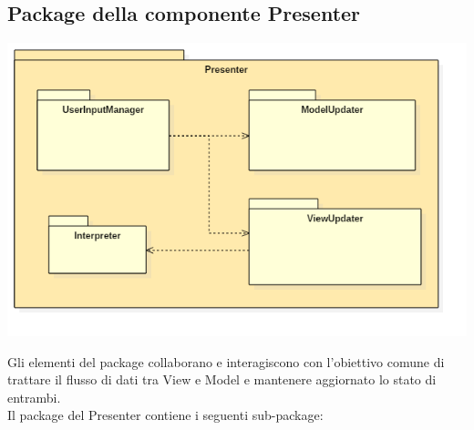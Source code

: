 \documentclass[a4paper,11pt]{article}
\begin{document}
	\subsection{Package della componente Presenter}
	\begin{center}
		\includegraphics[scale=0.6]{../images/PresenterPackage.png}
	\end{center}
	Gli elementi del package collaborano e interagiscono con l'obiettivo comune di trattare il flusso di dati tra View e Model e mantenere aggiornato lo stato di entrambi. \\
	Il package del Presenter contiene i seguenti sub-package:
\end{document}
